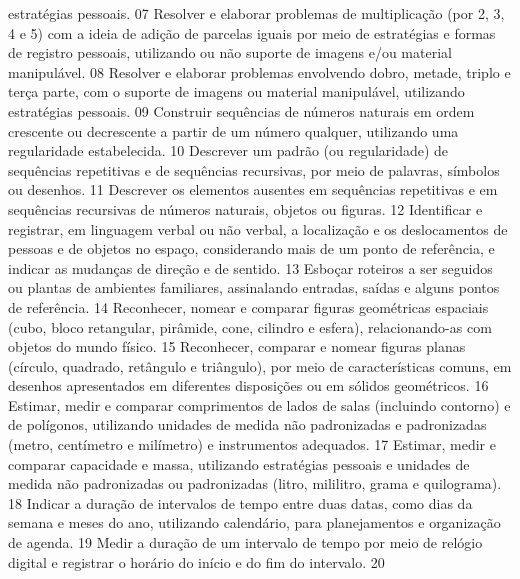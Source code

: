 {{{{					estratégias pessoais.
				}
				{07}{%
					Resolver e elaborar problemas de multiplicação (por 2, 3, 4 e 5) com a ideia de
					adição de parcelas iguais por meio de estratégias e formas de registro pessoais, utilizando ou
					não suporte de imagens e/ou material manipulável.
				}
				{08}{%
					Resolver e elaborar problemas envolvendo dobro, metade, triplo e terça parte,
					com o suporte de imagens ou material manipulável, utilizando estratégias pessoais.
				}
				{09}{%
					Construir sequências de números naturais em ordem crescente ou decrescente a
					partir de um número qualquer, utilizando uma regularidade estabelecida.
				}
				{10}{%
					Descrever um padrão (ou regularidade) de sequências repetitivas e de sequências
					recursivas, por meio de palavras, símbolos ou desenhos.
				}
				{11}{%
					Descrever os elementos ausentes em sequências repetitivas e em sequências
					recursivas de números naturais, objetos ou figuras.
				}
				{12}{%
					Identificar e registrar, em linguagem verbal ou não verbal, a localização e os
					deslocamentos de pessoas e de objetos no espaço, considerando mais de um ponto de
					referência, e indicar as mudanças de direção e de sentido.
				}
				{13}{%
					Esboçar roteiros a ser seguidos ou plantas de ambientes familiares, assinalando
					entradas, saídas e alguns pontos de referência.
				}
				{14}{%
					Reconhecer, nomear e comparar figuras geométricas espaciais (cubo, bloco
					retangular, pirâmide, cone, cilindro e esfera), relacionando-as com objetos do mundo físico.
				}
				{15}{%
					Reconhecer, comparar e nomear figuras planas (círculo, quadrado, retângulo
					e triângulo), por meio de características comuns, em desenhos apresentados em diferentes
					disposições ou em sólidos geométricos.
				}
				{16}{%
					Estimar, medir e comparar comprimentos de lados de salas (incluindo contorno)
					e de polígonos, utilizando unidades de medida não padronizadas e padronizadas (metro,
					centímetro e milímetro) e instrumentos adequados.
				}
				{17}{%
					Estimar, medir e comparar capacidade e massa, utilizando estratégias pessoais e
					unidades de medida não padronizadas ou padronizadas (litro, mililitro, grama e quilograma).
				}
				{18}{%
					Indicar a duração de intervalos de tempo entre duas datas, como dias da semana
					e meses do ano, utilizando calendário, para planejamentos e organização de agenda.
				}
				{19}{%
					Medir a duração de um intervalo de tempo por meio de relógio digital e registrar
					o horário do início e do fim do intervalo.
				}
				{20}{%
}}}}
